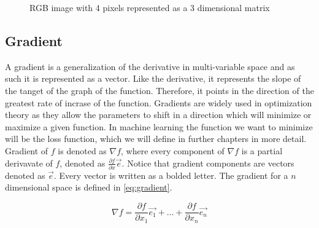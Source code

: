 \documentclass[times, utf8, diplomski]{fer}
\begin{document}
\begin{figure}
\centering
{}
\caption{RGB image with 4 pixels  represented as a 3 dimensional matrix}
\label{fig:image_matrix}
\end{figure}

\subsection{Gradient}
A gradient is a generalization of the derivative in multi-variable space and as such it is represented as a vector. Like the derivative, it represents the slope of the tanget of the graph of the function. Therefore, it points in the direction of the greatest rate of incrase of the function. Gradients are widely used in optimization theory as they allow the parameters to shift in a direction which will minimize or maximize a given function. In machine learning the function we want to minimize will be the loss function, which we will define in further chapters in more detail. Gradient of $f$ is denoted as $\nabla{f}$, where every component of $\nabla{f}$ is a partial derivavate of $f$, denoted as $\frac{\partial{f}}{\partial{x}}\vec{e}$. Notice that gradient components are vectors denoted as $\vec{e}$. Every vector is written as a bolded letter. The gradient for a $n$ dimensional space is defined in \ref{eq:gradient}.

\begin{equation} \label{eq:gradient}
    \nabla{f}= \frac{\partial{f}}{\partial{x_{1}}}\vec{e_1} + \hdots + 	   \frac{\partial{f}}{\partial{x_{n}}}\vec{e_n}
\end{equation}
\end{document}
